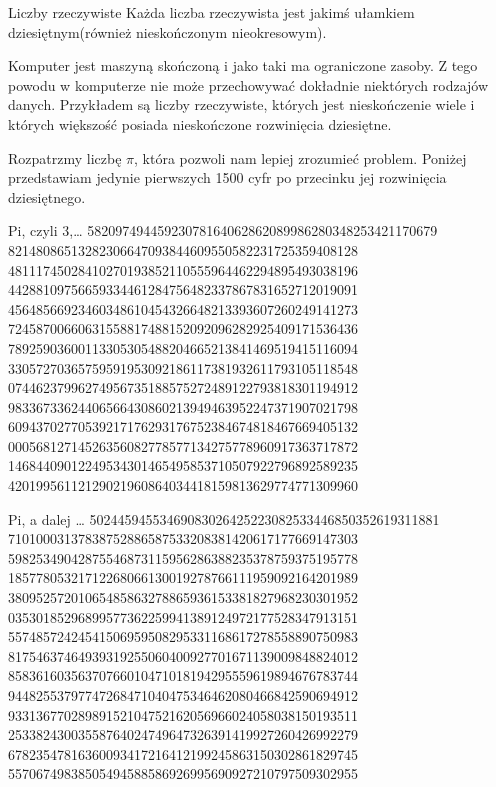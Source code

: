 \begin{frame}{Liczby rzeczywiste}
    Każda liczba rzeczywista jest jakimś ułamkiem dziesiętnym(również nieskończonym nieokresowym).

    Komputer jest maszyną skończoną i jako taki ma ograniczone zasoby. Z tego powodu w komputerze
    nie może przechowywać dokładnie niektórych rodzajów danych. Przykładem są liczby rzeczywiste,
    których jest nieskończenie wiele i których większość posiada nieskończone rozwinięcia dziesiętne.

    Rozpatrzmy liczbę $\pi$, która pozwoli nam lepiej zrozumieć problem.
    Poniżej przedstawiam jedynie pierwszych 1500 cyfr po przecinku jej rozwinięcia dziesiętnego.

\end{frame}
\begin{frame}{Pi, czyli 3,\dots}
    58209749445923078164062862089986280348253421170679
    82148086513282306647093844609550582231725359408128
    48111745028410270193852110555964462294895493038196
    44288109756659334461284756482337867831652712019091
    45648566923460348610454326648213393607260249141273
    72458700660631558817488152092096282925409171536436
    78925903600113305305488204665213841469519415116094
    33057270365759591953092186117381932611793105118548
    07446237996274956735188575272489122793818301194912
    98336733624406566430860213949463952247371907021798
    60943702770539217176293176752384674818467669405132
    00056812714526356082778577134275778960917363717872
    14684409012249534301465495853710507922796892589235
    42019956112129021960864034418159813629774771309960
\end{frame}
\begin{frame}{Pi, a dalej \dots}
    50244594553469083026425223082533446850352619311881
    71010003137838752886587533208381420617177669147303
    59825349042875546873115956286388235378759375195778
    18577805321712268066130019278766111959092164201989
    38095257201065485863278865936153381827968230301952
    03530185296899577362259941389124972177528347913151
    55748572424541506959508295331168617278558890750983
    81754637464939319255060400927701671139009848824012
    85836160356370766010471018194295559619894676783744
    94482553797747268471040475346462080466842590694912
    93313677028989152104752162056966024058038150193511
    25338243003558764024749647326391419927260426992279
    67823547816360093417216412199245863150302861829745
    55706749838505494588586926995690927210797509302955
\end{frame}
